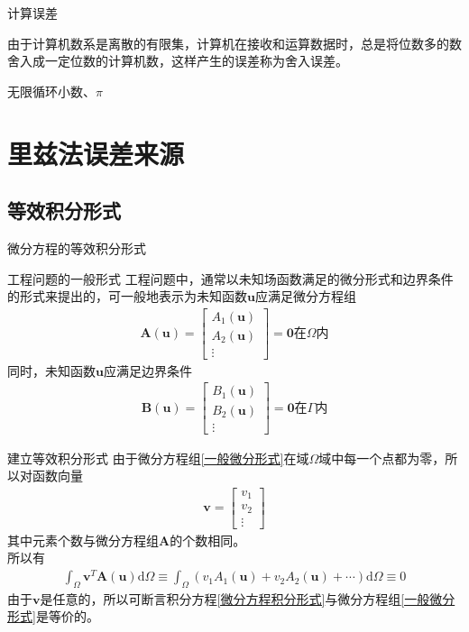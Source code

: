 \documentclass[11pt]{beamer}
\begin{document}
\begin{frame}{计算误差}
\begin{theorem}[舍入误差]
由于计算机数系是离散的有限集，计算机在接收和运算数据时，总是将位数多的数舍入成一定位数的计算机数，这样产生的误差称为舍入误差。
\end{theorem}
\begin{example}
无限循环小数、$\pi$
\end{example}
\end{frame}



\section{里兹法误差来源}
\subsection{等效积分形式}
\begin{frame}{微分方程的等效积分形式}
\begin{block}{工程问题的一般形式}
工程问题中，通常以未知场函数满足的微分形式和边界条件的形式来提出的，可一般地表示为未知函数$\textbf{u}$应满足微分方程组
\begin{align}
\textbf{A}(\textbf{u})=
\left[ \begin{matrix}
A_1(\textbf{u})\\ 
A_2(\textbf{u})\\ 
\vdots
\end{matrix}\right]
= \textbf{0}
\text{在$\Omega$内}
\label{一般微分形式}
\end{align}
同时，未知函数$\textbf{u}$应满足边界条件
\begin{align}
\textbf{B}(\textbf{u})=
\left[ \begin{matrix}
B_1(\textbf{u})\\ 
B_2(\textbf{u})\\ 
\vdots
\end{matrix}\right]
= \textbf{0}
\text{在$\Gamma$内}
\label{一般边界形式}
\end{align}
\end{block}
\end{frame}

\begin{frame}{建立等效积分形式}
由于微分方程组\ref{一般微分形式}在域$\Omega$域中每一个点都为零，所以对函数向量
\begin{align}
\textbf{v}=
\left[ \begin{matrix}
v_1\\ 
v_2\\ 
\vdots
\end{matrix}\right]
\end{align}
其中元素个数与微分方程组$\textbf{A}$的个数相同。\\

所以有
\begin{align}
\int_\Omega \textbf{v}^T\textbf{A}(\textbf{u})\mathrm{d}\Omega\equiv
\int_\Omega (v_1 A_1(\textbf{u})+v_2 A_2(\textbf{u})+\cdots)\mathrm{d}\Omega\equiv0
\label{微分方程积分形式}
\end{align}
由于$\textbf{v}$是任意的，所以可断言积分方程\ref{微分方程积分形式}与微分方程组\ref{一般微分形式}是等价的。
\end{frame}
\end{document}
